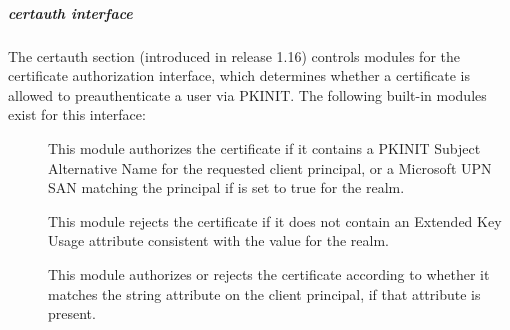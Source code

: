 \documentclass[letterpaper,10pt,english]{sphinxmanual}
\begin{document}
\subparagraph{certauth interface}
\label{\detokenize{admin/conf_files/krb5_conf:certauth}}\label{\detokenize{admin/conf_files/krb5_conf:certauth-interface}}
The certauth section (introduced in release 1.16) controls modules for
the certificate authorization interface, which determines whether a
certificate is allowed to preauthenticate a user via PKINIT.  The
following built-in modules exist for this interface:
\begin{description}
\item[{}] \leavevmode
This module authorizes the certificate if it contains a PKINIT
Subject Alternative Name for the requested client principal, or a
Microsoft UPN SAN matching the principal if 
is set to true for the realm.

\item[{}] \leavevmode
This module rejects the certificate if it does not contain an
Extended Key Usage attribute consistent with the
 value for the realm.

\item[{}] \leavevmode
This module authorizes or rejects the certificate according to
whether it matches the  string attribute on
the client principal, if that attribute is present.

\end{description}
\end{document}
